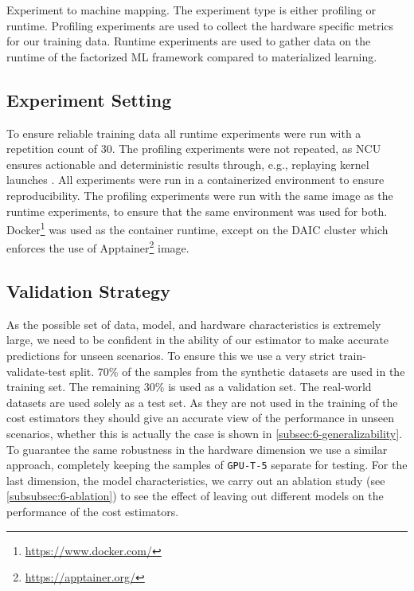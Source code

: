 \begin{table}[ht]
    \centering
    
    \caption[Experiment to machine mapping]{Experiment to machine mapping. The experiment type is either profiling or runtime. Profiling experiments are used to collect the hardware specific metrics for our training data. Runtime experiments are used to gather data on the runtime of the factorized ML framework compared to materialized learning.}
    \label{tab:6-hardware-overview}
\end{table}

\subsection{Experiment Setting}
To ensure reliable training data all runtime experiments were run with a repetition count of $30$. The profiling experiments were not repeated, as NCU ensures actionable and deterministic results through, e.g., replaying kernel launches \cite{nsight_compute}. All experiments were run in a containerized environment to ensure reproducibility. The profiling experiments were run with the same image as the runtime experiments, to ensure that the same environment was used for both. Docker\footnote{\url{https://www.docker.com/}} was used as the container runtime, except on the DAIC cluster which enforces the use of Apptainer\footnote{\url{https://apptainer.org/}} image.

\subsection{Validation Strategy}
\label{subsec:6-validation-strategy}

As the possible set of data, model, and hardware characteristics is extremely large, we need to be confident in the ability of our estimator to make accurate predictions for unseen scenarios. To ensure this we use a very strict train-validate-test split. 70\% of the samples from the synthetic datasets are used in the training set. The remaining 30\% is used as a validation set. The real-world datasets are used solely as a test set. As they are not used in the training of the cost estimators they should give an accurate view of the performance in unseen scenarios, whether this is actually the case is shown in \autoref{subsec:6-generalizability}. To guarantee the same robustness in the hardware dimension we use a similar approach, completely keeping the samples of \texttt{GPU-T-5} separate for testing. For the last dimension, the model characteristics, we carry out an ablation study (see \autoref{subsubsec:6-ablation}) to see the effect of leaving out different models on the performance of the cost estimators.

